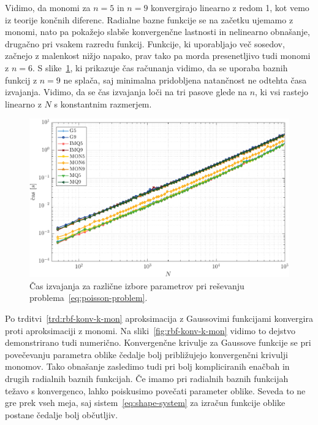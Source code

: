\documentclass[12pt,a4paper,twoside]{article}
\theoremstyle{definition} %
\theoremstyle{plain} %
\numberwithin{equation}{section}
\newlength{\iw}
\begin{document}
Vidimo, da monomi za $n=5$ in $n=9$ konvergirajo linearno z redom 1, kot vemo iz
teorije končnih diferenc. Radialne bazne funkcije se na začetku ujemamo z
monomi, nato pa pokažejo slabše konvergenčne lastnosti in nelinearno obnašanje,
drugačno pri vsakem razredu funkcij. Funkcije, ki uporabljajo več sosedov,
začnejo z malenkost nižjo napako, prav tako pa morda presenetljivo tudi
monomi z $n=6$. S slike~\ref{fig:poisson-square-time},
ki prikazuje čas računanja vidimo, da se uporaba baznih funkcij z $n = 9$
ne splača, saj minimalna pridobljena natančnost ne odtehta časa izvajanja.
Vidimo, da se čas izvajanja loči na tri pasove glede na $n$, ki vsi
rastejo linearno z $N$ s konstantnim razmerjem.

\begin{figure}[h]
  \centering
  \includegraphics[width=\iw]{images/poisson_square_time.pdf}
  \caption{Čas izvajanja za različne izbore parametrov pri reševanju
  problema~\eqref{eq:poisson-problem}.}
  \label{fig:poisson-square-time}
\end{figure}

Po trditvi~\ref{trd:rbf-konv-k-mon} aproksimacija z Gaussovimi funkcijami
konvergira proti aproksimaciji z monomi. Na sliki~\ref{fig:rbf-konv-k-mon}
vidimo to dejstvo demonstrirano tudi numerično. Konvergenčne krivulje za
Gaussove funkcije se pri povečevanju parametra oblike čedalje bolj približujejo
konvergenčni krivulji monomov. Tako obnašanje zasledimo tudi pri bolj
kompliciranih enačbah in drugih radialnih baznih funkcijah. Če imamo pri radialnih
baznih funkcijah težavo s konvergenco, lahko poiskusimo povečati parameter
oblike. Seveda to ne gre prek vseh meja, saj sistem~\eqref{eq:shape-system}
za izračun funkcije oblike postane čedalje bolj občutljiv.
\end{document}
